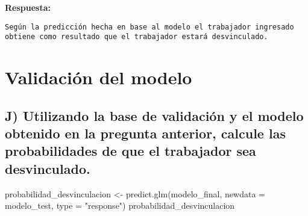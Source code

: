 \documentclass[
]{article}
\newenvironment{Shaded}{\begin{snugshade}}{\end{snugshade}}
\newcommand{\AttributeTok}[1]{\textcolor[rgb]{0.77,0.63,0.00}{#1}}
\newcommand{\FunctionTok}[1]{\textcolor[rgb]{0.00,0.00,0.00}{#1}}
\newcommand{\NormalTok}[1]{#1}
\newcommand{\OtherTok}[1]{\textcolor[rgb]{0.56,0.35,0.01}{#1}}
\newcommand{\StringTok}[1]{\textcolor[rgb]{0.31,0.60,0.02}{#1}}
\begin{document}
\textbf{Respuesta:}

\begin{verbatim}
Según la predicción hecha en base al modelo el trabajador ingresado obtiene como resultado que el trabajador estará desvinculado.
\end{verbatim}

\hypertarget{validaciuxf3n-del-modelo}{%
\section{Validación del modelo}\label{validaciuxf3n-del-modelo}}

\hypertarget{j-utilizando-la-base-de-validaciuxf3n-y-el-modelo-obtenido-en-la-pregunta-anterior-calcule-las-probabilidades-de-que-el-trabajador-sea-desvinculado.}{%
\subsection{J) Utilizando la base de validación y el modelo obtenido en
la pregunta anterior, calcule las probabilidades de que el trabajador
sea
desvinculado.}\label{j-utilizando-la-base-de-validaciuxf3n-y-el-modelo-obtenido-en-la-pregunta-anterior-calcule-las-probabilidades-de-que-el-trabajador-sea-desvinculado.}}

\begin{Shaded}
\begin{Highlighting}[]
\NormalTok{probabilidad\_desvinculacion }\OtherTok{\textless{}{-}} \FunctionTok{predict.glm}\NormalTok{(modelo\_final, }\AttributeTok{newdata =}\NormalTok{ modelo\_test, }\AttributeTok{type =} \StringTok{"response"}\NormalTok{)}
\NormalTok{probabilidad\_desvinculacion}
\end{Highlighting}
\end{Shaded}
\end{document}
